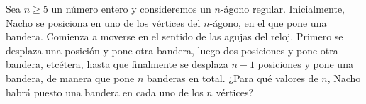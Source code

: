 Sea $n\geq 5$ un número entero y consideremos un $n$-ágono regular. Inicialmente, Nacho se posiciona en uno de los vértices del $n$-ágono, en el que pone una bandera. Comienza a moverse en el sentido de las agujas del reloj. Primero se desplaza una posición y pone otra bandera, luego dos posiciones y pone otra bandera, etcétera, hasta que finalmente se desplaza $n-1$ posiciones y pone una bandera, de manera que pone $n$ banderas en total. ¿Para qué valores de $n$, Nacho habrá puesto una bandera en cada uno de los $n$ vértices?